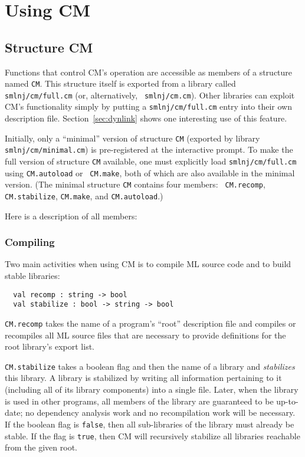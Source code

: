 \documentclass{article}
\begin{document}
\section{Using CM}

\subsection{Structure CM}
\label{sec:api}

Functions that control CM's operation are accessible as members of a
structure named {\tt CM}.  This structure itself is exported from a
library called {\tt smlnj/cm/full.cm} (or, alternatively, {\tt
smlnj/cm.cm}).  Other libraries can exploit CM's functionality simply
by putting a {\tt smlnj/cm/full.cm} entry into their own description file.
Section~\ref{sec:dynlink} shows one interesting use of this feature.

Initially, only a ``minimal'' version of structure {\tt CM} (exported
by library {\tt smlnj/cm/minimal.cm}) is pre-registered at the interactive
prompt.  To make the full version of structure {\tt CM} available, one
must explicitly load {\tt smlnj/cm/full.cm} using {\tt CM.autoload} or {\tt
CM.make}, both of which are also available in the minimal version.
(The minimal structure {\tt CM} contains four members: {\tt
CM.recomp}, {\tt CM.stabilize}, {\tt CM.make}, and {\tt CM.autoload}.)

Here is a description of all members:

\subsubsection*{Compiling}

Two main activities when using CM is to compile ML source code and to
build stable libraries:

\begin{verbatim}
  val recomp : string -> bool
  val stabilize : bool -> string -> bool
\end{verbatim}

{\tt CM.recomp} takes the name of a program's ``root'' description
file and compiles or recompiles all ML source files that are necessary
to provide definitions for the root library's export list.

{\tt CM.stabilize} takes a boolean flag and then the name of a library
and {\em stabilizes} this library.  A library is stabilized by writing
all information pertaining to it (including all of its library
components) into a single file.  Later, when the library is used in
other programs, all members of the library are guaranteed to be
up-to-date; no dependency analysis work and no recompilation work will
be necessary.  If the boolean flag is {\tt false}, then all
sub-libraries of the library must already be stable.  If the flag is
{\tt true}, then CM will recursively stabilize all libraries reachable
from the given root.
\end{document}
